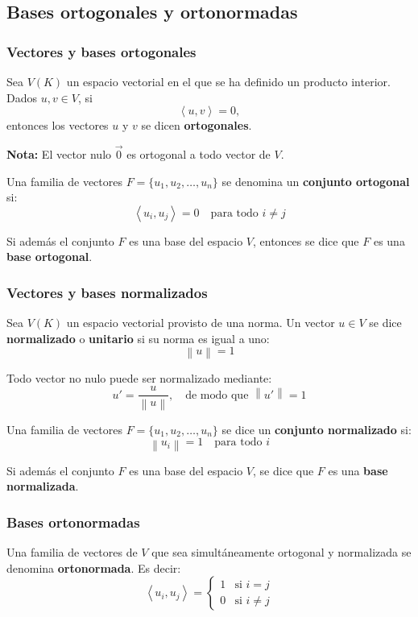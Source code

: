 \subsection{Bases ortogonales y ortonormadas}

\subsubsection{Vectores y bases ortogonales}

Sea \(V(K)\) un espacio vectorial en el que se ha definido un producto interior. Dados \(u, v \in V\), si
\[
\left\langle u, v \right\rangle = 0,
\]
entonces los vectores \(u\) y \(v\) se dicen \textbf{ortogonales}.

\textbf{Nota:} El vector nulo \(\vec{0}\) es ortogonal a todo vector de \(V\).

Una familia de vectores \(F = \{u_1, u_2, \dots, u_n\}\) se denomina un \textbf{conjunto ortogonal} si:
\[
\left\langle u_i, u_j \right\rangle = 0 \quad \text{para todo } i \neq j
\]

Si además el conjunto \(F\) es una base del espacio \(V\), entonces se dice que \(F\) es una \textbf{base ortogonal}.

\subsubsection{Vectores y bases normalizados}

Sea \(V(K)\) un espacio vectorial provisto de una norma. Un vector \(u \in V\) se dice \textbf{normalizado} o \textbf{unitario} si su norma es igual a uno:
\[
\left\lVert u \right\rVert = 1
\]

Todo vector no nulo puede ser normalizado mediante:
\[
u' = \frac{u}{\left\lVert u \right\rVert}, \quad \text{de modo que } \left\lVert u' \right\rVert = 1
\]

Una familia de vectores \(F = \{u_1, u_2, \dots, u_n\}\) se dice un \textbf{conjunto normalizado} si:
\[
\left\lVert u_i \right\rVert = 1 \quad \text{para todo } i
\]

Si además el conjunto \(F\) es una base del espacio \(V\), se dice que \(F\) es una \textbf{base normalizada}.

\subsubsection{Bases ortonormadas}

Una familia de vectores de \(V\) que sea simultáneamente ortogonal y normalizada se denomina \textbf{ortonormada}. Es decir:
\[
\left\langle u_i, u_j \right\rangle = 
\begin{cases}
1 & \text{si } i = j \\
0 & \text{si } i \neq j
\end{cases}
\]

